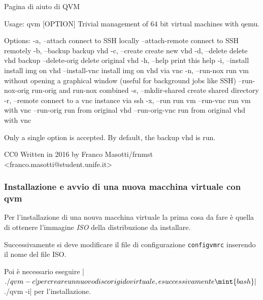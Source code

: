 \documentclass[10pt,titlepage,twoside,a4paper]{report}
\newenvironment{code}{\singlespacing\captionsetup{type=listing}}{}
\begin{document}
\begin{minipage}{\textwidth}
\centering
\begin{code}
    \caption{Pagina di aiuto di QVM}
    \label{lst:paginaAiutoQvm}
    \begin{textcode*}{}
Usage: qvm [OPTION]
Trivial management of 64 bit virtual machines with qemu.

Options:
    -a, --attach                connect to SSH locally
        --attach-remote         connect to SSH remotely
    -b, --backup                backup vhd
    -c, --create                create new vhd
    -d, --delete                delete vhd backup
        --delete-orig           delete original vhd
    -h, --help                  print this help
    -i, --install               install img on vhd
        --install-vnc           install img on vhd via vnc
    -n, --run-nox               run vm without opening a graphical window
                                (useful for background jobs like SSH)
        --run-nox-orig          run-orig and run-nox combined
    -s, --mkdir-shared          create shared directory
    -r, --remote                connect to a vnc instance via ssh
    -x, --run                   run vm
        --run-vnc               run vm with vnc
        --run-orig              run from original vhd
        --run-orig-vnc          run from original vhd with vnc


Only a single option is accepted.
By default, the backup vhd is run.

CC0
Written in 2016 by Franco Masotti/frnmst <franco.masotti@student.unife.it>
    \end{textcode*}
\end{code}
\end{minipage}

\subsubsection{Installazione e avvio di una nuova macchina virtuale con qvm}
Per l'installazione di una nouva macchina virtuale la prima cosa da fare è 
quella di ottenere l'immagine \emph{ISO} della distribuzione da installare.

Successivamente si deve modificare il file di 
configurazione \texttt{configvmrc} inserendo il nome del file ISO.

Poi è necessario eseguire |$ ./qvm -c| per creare un nuovo 
disco rigido virtuale, e successivamente \mint{bash}|$ ./qvm -i| per 
l'installazione.
\end{document}
